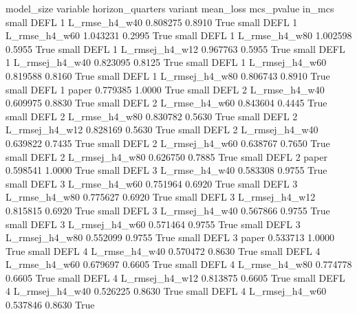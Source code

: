 model_size variable  horizon_quarters        variant  mean_loss  mcs_pvalue  in_mcs
     small     DEFL                 1  L_rmse_h4_w40   0.808275      0.8910    True
     small     DEFL                 1  L_rmse_h4_w60   1.043231      0.2995    True
     small     DEFL                 1  L_rmse_h4_w80   1.002598      0.5955    True
     small     DEFL                 1 L_rmsej_h4_w12   0.967763      0.5955    True
     small     DEFL                 1 L_rmsej_h4_w40   0.823095      0.8125    True
     small     DEFL                 1 L_rmsej_h4_w60   0.819588      0.8160    True
     small     DEFL                 1 L_rmsej_h4_w80   0.806743      0.8910    True
     small     DEFL                 1          paper   0.779385      1.0000    True
     small     DEFL                 2  L_rmse_h4_w40   0.609975      0.8830    True
     small     DEFL                 2  L_rmse_h4_w60   0.843604      0.4445    True
     small     DEFL                 2  L_rmse_h4_w80   0.830782      0.5630    True
     small     DEFL                 2 L_rmsej_h4_w12   0.828169      0.5630    True
     small     DEFL                 2 L_rmsej_h4_w40   0.639822      0.7435    True
     small     DEFL                 2 L_rmsej_h4_w60   0.638767      0.7650    True
     small     DEFL                 2 L_rmsej_h4_w80   0.626750      0.7885    True
     small     DEFL                 2          paper   0.598541      1.0000    True
     small     DEFL                 3  L_rmse_h4_w40   0.583308      0.9755    True
     small     DEFL                 3  L_rmse_h4_w60   0.751964      0.6920    True
     small     DEFL                 3  L_rmse_h4_w80   0.775627      0.6920    True
     small     DEFL                 3 L_rmsej_h4_w12   0.815815      0.6920    True
     small     DEFL                 3 L_rmsej_h4_w40   0.567866      0.9755    True
     small     DEFL                 3 L_rmsej_h4_w60   0.571464      0.9755    True
     small     DEFL                 3 L_rmsej_h4_w80   0.552099      0.9755    True
     small     DEFL                 3          paper   0.533713      1.0000    True
     small     DEFL                 4  L_rmse_h4_w40   0.570472      0.8630    True
     small     DEFL                 4  L_rmse_h4_w60   0.679697      0.6605    True
     small     DEFL                 4  L_rmse_h4_w80   0.774778      0.6605    True
     small     DEFL                 4 L_rmsej_h4_w12   0.813875      0.6605    True
     small     DEFL                 4 L_rmsej_h4_w40   0.526225      0.8630    True
     small     DEFL                 4 L_rmsej_h4_w60   0.537846      0.8630    True
